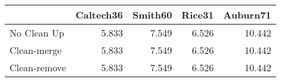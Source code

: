 \begin{tabular}{lrrrr}
\toprule
{} & Caltech36 & Smith60 & Rice31 & Auburn71 \\
\midrule
No Clean Up  &     5.833 &   7.549 &  6.526 &   10.442 \\
Clean-merge  &     5.833 &   7.549 &  6.526 &   10.442 \\
Clean-remove &     5.833 &   7.549 &  6.526 &   10.442 \\
\bottomrule
\end{tabular}
